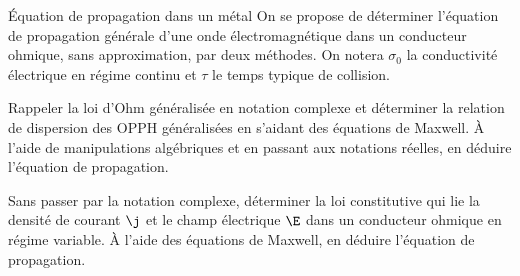 \begin{exo}[PC][3][TD]{Équation de propagation dans un métal}
  On se propose de déterminer l'équation de propagation générale d'une onde électromagnétique dans un conducteur ohmique, sans approximation, par deux méthodes. On notera $\sigma_0$ la conductivité électrique en régime continu et $\tau$ le temps typique de collision.
  \begin{quest}
    \item Rappeler la loi d'Ohm généralisée en notation complexe et déterminer la relation de dispersion des OPPH généralisées en s'aidant des équations de Maxwell. À l'aide de manipulations algébriques et en passant aux notations réelles, en déduire l'équation de propagation.
    \item Sans passer par la notation complexe, déterminer la loi constitutive qui lie la densité de courant $\j$ et le champ électrique $\E$ dans un conducteur ohmique en régime variable. À l'aide des équations de Maxwell, en déduire l'équation de propagation.
  \end{quest}
  \end{exo}

